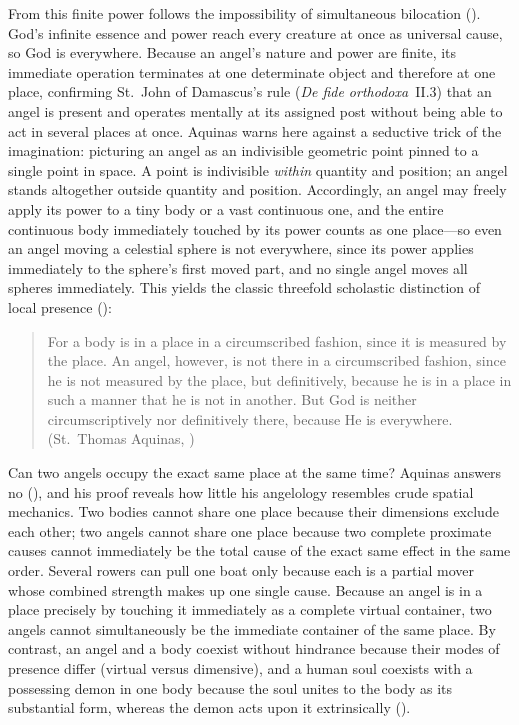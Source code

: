 From this finite power follows the impossibility of simultaneous bilocation (). God's infinite essence and power reach every creature at once as universal cause, so God is everywhere. Because an angel's nature and power are finite, its immediate operation terminates at one determinate object and therefore at one place, confirming St.~John of Damascus's rule (\emph{De fide orthodoxa}~II.3) that an angel is present and operates mentally at its assigned post without being able to act in several places at once. Aquinas warns here against a seductive trick of the imagination: picturing an angel as an indivisible geometric point pinned to a single point in space. A point is indivisible \emph{within} quantity and position; an angel stands altogether outside quantity and position. Accordingly, an angel may freely apply its power to a tiny body or a vast continuous one, and the entire continuous body immediately touched by its power counts as one place---so even an angel moving a celestial sphere is not everywhere, since its power applies immediately to the sphere's first moved part, and no single angel moves all spheres immediately. This yields the classic threefold scholastic distinction of local presence ():
\begin{quotation}
For a body is in a place in a circumscribed fashion, since it is measured by the place. An angel, however, is not there in a circumscribed fashion, since he is not measured by the place, but definitively, because he is in a place in such a manner that he is not in another. But God is neither circumscriptively nor definitively there, because He is everywhere. (St.~Thomas Aquinas, )
\end{quotation}

Can two angels occupy the exact same place at the same time? Aquinas answers no (), and his proof reveals how little his angelology resembles crude spatial mechanics. Two bodies cannot share one place because their dimensions exclude each other; two angels cannot share one place because two complete proximate causes cannot immediately be the total cause of the exact same effect in the same order. Several rowers can pull one boat only because each is a partial mover whose combined strength makes up one single cause. Because an angel is in a place precisely by touching it immediately as a complete virtual container, two angels cannot simultaneously be the immediate container of the same place. By contrast, an angel and a body coexist without hindrance because their modes of presence differ (virtual versus dimensive), and a human soul coexists with a possessing demon in one body because the soul unites to the body as its substantial form, whereas the demon acts upon it extrinsically ().

